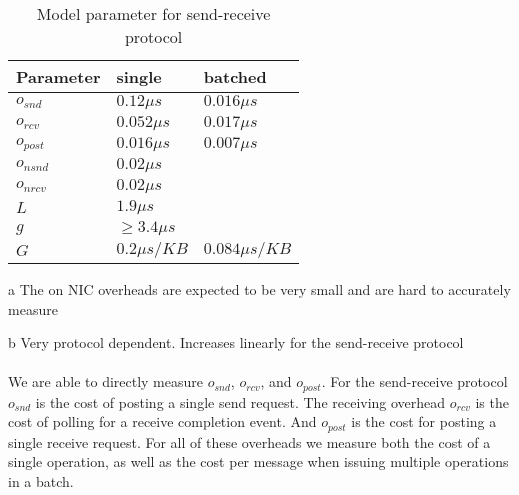 \begin{table}[!ht]
\setlength\tabcolsep{1.5pt}
\centering
\caption{Model parameter for send-receive protocol}
\label{tab:model}
\begin{threeparttable}[t]
 \begin{tabular}{|x{3.5cm}|x{3.5cm}|x{3.5cm}|} %
 \hline
 Parameter    &  single & batched \\
  \hline
  \hline
 $o_{snd}$    & $0.12 \mu s$ &  $0.016 \mu s$\\
  \hline
 $o_{rcv}$    & $0.052 \mu s$ & $0.017 \mu s$\\
  \hline
 $o_{post}$   & $0.016 \mu s$ & $0.007 \mu s$\\
  \hline
 $o_{nsnd}$   & $0.02 \mu s$ &   \\
  \hline
 $o_{nrcv}$   & $0.02 \mu s$ &   \\
  \hline
 $L$          & $1.9 \mu s$ &  \\
  \hline
 $g$          & $\geq 3.4 \mu s$  & \\
 \hline
 $G$          & $0.2\mu s / KB$  & $0.084\mu s / KB$\\

\hline
\end{tabular}
\begin{tablenotes}
\item[a] \small The on NIC overheads are expected to be very small and are hard to accurately measure
\item[b] \small Very protocol dependent. Increases linearly for the send-receive protocol
\end{tablenotes}
\end{threeparttable}
\end{table}


\paragraph{} We are able to directly measure $o_{snd}$, $o_{rcv}$, and $o_{post}$. For the send-receive protocol $o_{snd}$ is the cost of 
posting a single send request. The receiving overhead $o_{rcv}$ is the cost of polling for a receive completion event. And
$o_{post}$ is the cost for posting a single receive request. For all of these overheads we measure both the cost of a single
operation, as well as the cost per message when issuing multiple operations in a batch.

